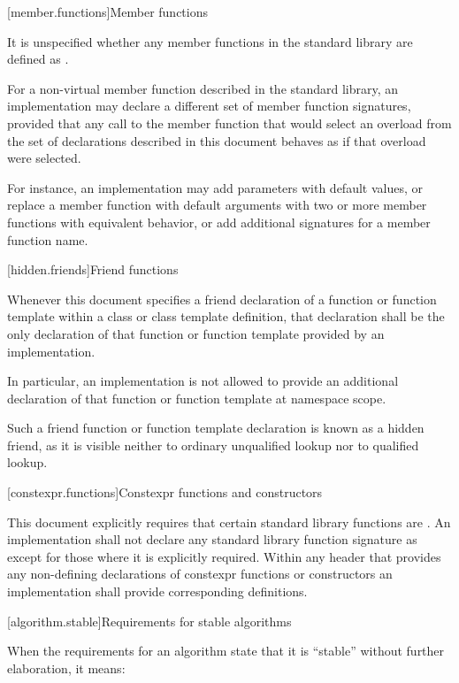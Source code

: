 [member.functions]{Member functions}

\pnum
It is unspecified whether any member functions in the \Cpp{} standard library are defined as
.

\pnum
For a non-virtual member function described in the \Cpp{} standard library,
an implementation may declare a different set of member function signatures,
provided that any call to the member function that would select
an overload from the set of declarations described in this document
behaves as if that overload were selected.
\begin{note}
For instance, an implementation may add parameters with default values,
or replace a member function with default arguments
with two or more member functions with equivalent behavior,
or add additional signatures for a member function name.
\end{note}

[hidden.friends]{Friend functions}

\pnum
Whenever this document specifies
a friend declaration of a function or function template
within a class or class template definition,
that declaration shall be
the only declaration of that function or function template
provided by an implementation.
\begin{note}
In particular,
an implementation is not allowed to provide
an additional declaration of that function or function template
at namespace scope.
\end{note}
\begin{note}
Such a friend function or function template declaration
is known as a hidden friend,
as it is visible neither
to ordinary unqualified lookup nor
to qualified lookup.
\end{note}

[constexpr.functions]{Constexpr functions and constructors}

\pnum
This document explicitly requires that certain standard library functions are
. An implementation shall not declare
any standard library function signature as  except for those where
it is explicitly required.
Within any header that provides any non-defining declarations of constexpr
functions or constructors an implementation shall provide corresponding definitions.

[algorithm.stable]{Requirements for stable algorithms}

\pnum
{}%
%
When the requirements for an algorithm state that it is ``stable'' without further elaboration,
it means:

